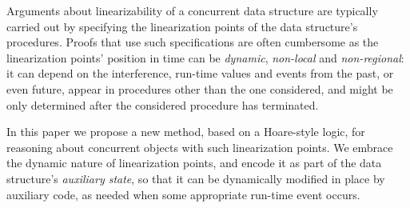 



Arguments about linearizability of a concurrent data structure are
typically carried out by specifying the linearization points of the
data structure's procedures.
%
Proofs that use such specifications are often cumbersome as the
linearization points' position in time can be \emph{dynamic},
\emph{non-local} and \emph{non-regional}: it can depend on the
interference, run-time values and events from the past, or even
future, appear in procedures other than the one considered, and might
be only determined after the considered procedure has terminated.

In this paper we propose a new method, based on a Hoare-style logic,
for reasoning about concurrent objects with such linearization
points. We embrace the dynamic nature of linearization points, and
encode it as part of the data structure's \emph{auxiliary state}, so
that it can be dynamically modified in place by auxiliary
  code, as needed when some appropriate run-time event occurs.

